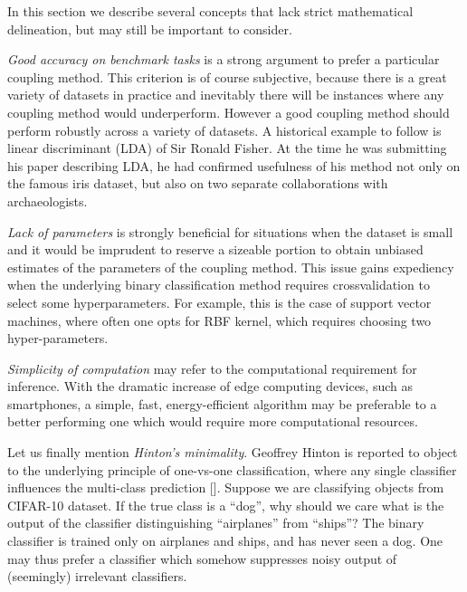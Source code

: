 \documentclass[twoside,11pt]{article}
\begin{document}
\label{sec:des:inexact}

In this section we describe several concepts that lack strict mathematical delineation, but may still be important to consider.

\emph{Good accuracy on benchmark tasks} is  a strong argument to prefer a particular coupling method. This criterion is of course subjective, because there is a great variety of datasets in practice and inevitably there will be instances where any coupling method would underperform. However a good coupling method should perform robustly across a variety of datasets. A historical  example to follow is linear discriminant (LDA) of  Sir Ronald Fisher. At the time he was submitting his paper describing LDA, he had confirmed usefulness of his method not only on the famous iris dataset, but also on two separate collaborations with archaeologists. 

\emph{Lack of parameters} is strongly beneficial for situations when the dataset is small and it would be imprudent to reserve a sizeable portion to obtain unbiased estimates of the parameters of the coupling method. This issue gains expediency when the underlying binary classification method requires crossvalidation to select some hyperparameters. For example, this is the case of support vector machines, where often one opts for RBF kernel, which requires choosing two hyper-parameters. 

\emph{Simplicity of computation}  may refer to the computational requirement for inference. With the dramatic increase of edge computing devices, such as smartphones, a simple, fast, energy-efficient algorithm may be preferable to a better performing one which would require more computational resources. 

Let us finally mention \emph{Hinton's minimality}. Geoffrey Hinton is reported to object to the underlying principle of one-vs-one classification, where any single classifier influences the multi-class prediction [\cite[p.~467]{hastie1998classification}]. Suppose we are classifying objects from CIFAR-10 dataset.  If the true class is  a ``dog'', why should we care what is the output of the classifier distinguishing ``airplanes'' from ``ships''? The binary classifier is trained only on airplanes and ships, and has never seen a dog. One may thus prefer a classifier which somehow suppresses noisy output of (seemingly) irrelevant classifiers.


\end{document}
